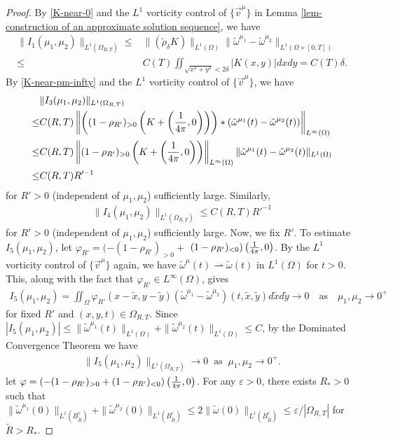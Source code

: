 \documentclass[1 [leqno, 11pt]{amsart}
\numberwithin{equation}{section}
\begin{document}
\begin{CJK*}{GBK}{song}
\begin{appendix}
\begin{proof}
By \eqref{K-near-0} and
the  $L^1$  vorticity control of $\{\vec{v}^\mu\}$  in Lemma \ref{lem-construction of an approximate solution sequence}, we have
\begin{align}\nonumber
\|I_1(\mu_1,\mu_2)\|_{L^1(\Omega_{R,T})}\leq& \|(\tilde\rho_\delta K)\|_{L^1(\Omega)}\|\tilde\omega^{\mu_1}-\tilde\omega^{\mu_2}\|_{L^1(\Omega\times[0,T])}\\\label{I1-estimate}
\leq& C(T)\iint_{\sqrt{x^2+y^2}<2\delta}|K(x,y)|dxdy=C(T)\delta.
\end{align}
By \eqref{K-near-pm-infty} and the  $L^1$  vorticity control of $\{\vec{v}^\mu\}$, we have
\begin{align}\nonumber
&\|I_3(\mu_1,\mu_2)\|_{L^1(\Omega_{R,T})}\\\nonumber
\leq&C(R,T)\left\|\left((1-\rho_{R'})_{>0}\left(K+\left({1\over 4\pi},0\right)\right)\right)\ast(\tilde\omega^{\mu_1}(t)-\tilde\omega^{\mu_2}(t))\right\|_{L^{\infty}(\Omega)}\\\nonumber
\leq& C(R,T)\left\|(1-\rho_{R'})_{>0}\left(K+\left({1\over 4\pi},0\right)\right)\right\|_{L^{\infty}(\Omega)}\|\tilde\omega^{\mu_1}(t)-\tilde\omega^{\mu_2}(t)\|_{L^1(\Omega)}\\\label{I3-estimate}
\leq &C(R,T) R'^{-1}
\end{align}
for $R'>0$ (independent of $\mu_1, \mu_2$) sufficiently large.
Similarly,
\begin{align}\label{I4-estimate}
\|I_4(\mu_1,\mu_2)\|_{L^1(\Omega_{R,T})}\leq C(R,T) R'^{-1}
\end{align}
for $R'>0$ (independent of $\mu_1, \mu_2$) sufficiently large. Now, we fix $R'$.
To estimate $I_5(\mu_1,\mu_2)$, let $\varphi_{R'}=(-(1-\rho_{R'})_{>0}+$ $(1-\rho_{R'})_{<0})\left({1\over 4\pi},0\right)$. By the  $L^1$  vorticity control of $\{\vec{v}^\mu\}$ again, we have $\tilde \omega^{\mu}(t)\rightharpoonup\tilde \omega(t)$ in $L^1(\Omega)$ for $t>0$. This, along with the fact that  $\varphi_{R'}\in L^\infty (\Omega)$,   gives
\begin{align*}
I_5(\mu_1,\mu_2)=\iint_{\Omega}\varphi_{R'}(x-\tilde x, y-\tilde y)(\tilde\omega^{\mu_1}-\tilde\omega^{\mu_2})(t,\tilde x,\tilde y) d\tilde xd\tilde y\to0\quad \text{as}\quad \mu_1,\mu_2\to0^+
\end{align*}
 for fixed $R'$ and $(x,y,t)\in \Omega_{R,T}$. Since $|I_5(\mu_1,\mu_2)|\leq \|\tilde\omega^{\mu_1}(t)\|_{L^1(\Omega)}+\|\tilde\omega^{\mu_2}(t)\|_{L^1(\Omega)}\leq C$, by the Dominated Convergence Theorem  we have
 \begin{align}\label{I5-estimate}
\|I_5(\mu_1,\mu_2)\|_{L^1(\Omega_{R,T})}\to0 \;\;\text{as}\;\; \mu_1,\mu_2\to0^+.
\end{align}
let $\varphi=\left(-(1-\rho_{R'})_{>0}+(1-\rho_{R'})_{<0}\right)\left({1\over 4\pi},0\right)$. For any $\varepsilon>0$, there exists $R_*>0$ such that $\|\tilde\omega^{\mu_1}(0)\|_{L^1(B_{\tilde R}^c)}+\|\tilde\omega^{\mu_2}(0)\|_{L^1(B_{\tilde R}^c)}\leq 2\|\tilde\omega(0)\|_{L^1(B_{\tilde R}^c)}\leq \varepsilon/|\Omega_{R,T}|$ for $\tilde R>R_*$.
\fi


\end{proof}
\end{appendix}
\end{CJK*}
\end{document}
